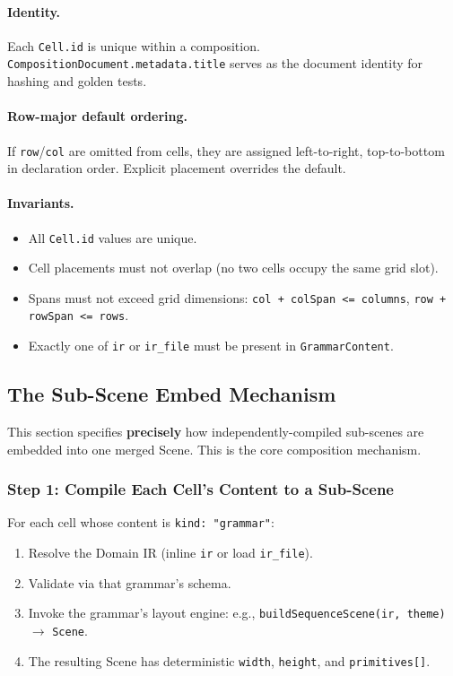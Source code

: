 \paragraph{Identity.}
Each \texttt{Cell.id} is unique within a composition.  \texttt{CompositionDocument.metadata.title} serves as the document identity for hashing and golden tests.

\paragraph{Row-major default ordering.}
If \texttt{row}/\texttt{col} are omitted from cells, they are assigned left-to-right, top-to-bottom in declaration order.  Explicit placement overrides the default.

\paragraph{Invariants.}
\begin{itemize}
  \item All \texttt{Cell.id} values are unique.
  \item Cell placements must not overlap (no two cells occupy the same grid slot).
  \item Spans must not exceed grid dimensions: \texttt{col + colSpan <= columns}, \texttt{row + rowSpan <= rows}.
  \item Exactly one of \texttt{ir} or \texttt{ir\_file} must be present in \texttt{GrammarContent}.
\end{itemize}

\subsection{The Sub-Scene Embed Mechanism}
\label{sec:composition-embed}

This section specifies \textbf{precisely} how independently-compiled sub-scenes are embedded into one merged Scene.  This is the core composition mechanism.

\subsubsection{Step 1: Compile Each Cell's Content to a Sub-Scene}

For each cell whose content is \texttt{kind: "grammar"}:
\begin{enumerate}
  \item Resolve the Domain IR (inline \texttt{ir} or load \texttt{ir\_file}).
  \item Validate via that grammar's schema.
  \item Invoke the grammar's layout engine: e.g., \texttt{buildSequenceScene(ir, theme)} $\to$ \texttt{Scene}.
  \item The resulting Scene has deterministic \texttt{width}, \texttt{height}, and \texttt{primitives[]}.
\end{enumerate}

